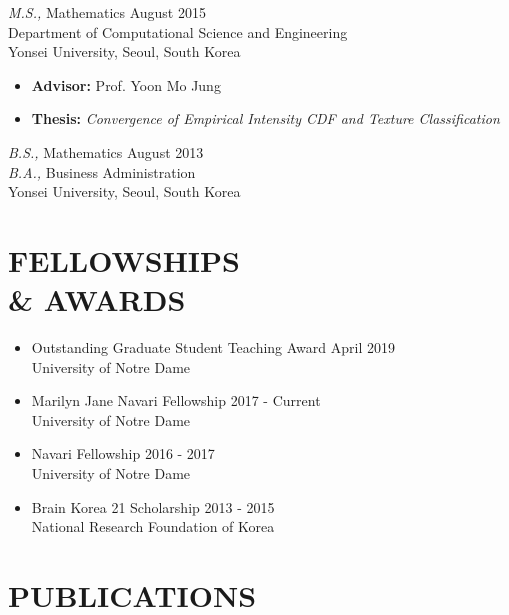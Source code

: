 \documentclass[margin, 10pt]{res} %
\begin{document}
\begin{resume}
{\sl M.S.,} Mathematics \hfill August 2015 \\
Department of Computational Science and Engineering\\ 
Yonsei University, Seoul, South Korea
\begin{itemize} \itemsep -1.0pt
	\item {\bf Advisor:} Prof. Yoon Mo Jung
	\item {\bf Thesis:} \emph{Convergence of Empirical Intensity CDF and Texture Classification}
\end{itemize}

{\sl B.S.,} Mathematics \hfill August 2013\\
{\sl B.A.,} Business Administration \\
Yonsei University, Seoul, South Korea
\vspace{.2cm}


\section{\sf FELLOWSHIPS\\ \& AWARDS} 

\begin{itemize}  \itemsep -1.0pt
	\item Outstanding Graduate Student Teaching Award \hfill April 2019 \\
	University of Notre Dame
	\item Marilyn Jane Navari Fellowship \hfill 2017 - Current \\
	University of Notre Dame
	\item Navari Fellowship \hfill2016 - 2017 \\
	University of Notre Dame
	\item Brain Korea 21 Scholarship \hfill 2013 - 2015\\National Research Foundation of Korea 
\end{itemize}
\vspace{.2cm}




\section{\sf PUBLICATIONS} 


\end{resume}
\end{document}
